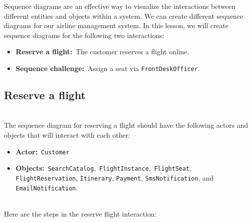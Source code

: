 

Sequence diagrams are an effective way to visualize the interactions between different entities and objects within a system. We can create different sequence diagrams for our airline management system. In this lesson, we will create sequence diagrams for the following two interactions:

\begin{itemize}
\item
\protect{}\label{FUA-FPxZZMi_9rmpw6hvX}
\textbf{Reserve a flight:}~The customer reserves a flight online.
\item
\protect{}\label{pZhxItrr5lJhaJfKGVrnX}
\textbf{Sequence challenge:}~Assign a seat via \texttt{FrontDeskOfficer}.
\end{itemize}

\subsection{Reserve a flight}\label{RK5dqDlX75q-YAh-2yDoy}
\\
The sequence diagram for reserving a flight should have the following actors and objects that will interact with each other:

\begin{itemize}
\item
\protect{}\label{PvHaeAAsKo-rNbwYAP6Ds}
\textbf{Actor:}~\texttt{Customer}
\item
\protect{}\label{8v3mrbBn42GPFxaxLjNrn}
\textbf{Objects:}~\texttt{SearchCatalog},~\texttt{FlightInstance},~\texttt{FlightSeat}, \texttt{FlightReservation}, \texttt{Itinerary}, \texttt{Payment}, \texttt{SmsNotification}, and \texttt{EmailNotification}.
\end{itemize}
\\
Here are the steps in the reserve flight interaction:

